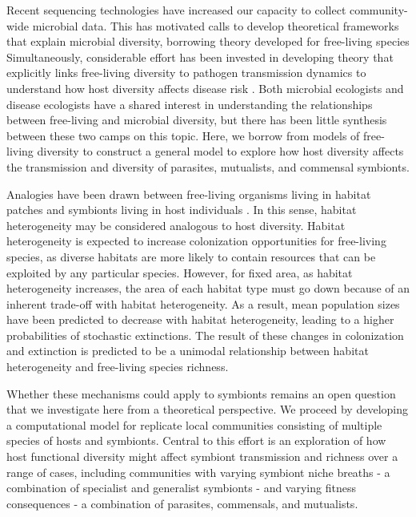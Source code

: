 \documentclass[12pt]{article}
\begin{document}
Recent sequencing technologies have increased our capacity to collect community-wide microbial data. 
This has motivated calls to develop theoretical frameworks that explain microbial diversity, borrowing theory developed for free-living species \citep{Prosser2007} %
Simultaneously, considerable effort has been invested in developing theory that explicitly links free-living diversity to pathogen transmission dynamics to understand how host diversity affects disease risk \citep{Dobson2004a, Roche2012, Joseph2013a, Mihaljevic2014}. 
Both microbial ecologists and disease ecologists have a shared interest in understanding the relationships between free-living and microbial diversity, but there has been little synthesis between these two camps on this topic. 
Here, we borrow from models of free-living diversity to construct a general model to explore how host diversity affects the transmission and diversity of parasites, mutualists, and commensal symbionts.

Analogies have been drawn between free-living organisms living in habitat patches and symbionts living in host individuals \citep{Mihaljevic2012}. 
In this sense, habitat heterogeneity may be considered analogous to host diversity. 
Habitat heterogeneity is expected to increase colonization opportunities for free-living species, as diverse habitats are more likely to contain resources that can be exploited by any particular species. 
However, for fixed area, as habitat heterogeneity increases, the area of each habitat type must go down because of an inherent trade-off with habitat heterogeneity. 
As a result, mean population sizes have been predicted to decrease with habitat heterogeneity, leading to a higher probabilities of stochastic extinctions. 
The result of these changes in colonization and extinction is predicted to be a unimodal relationship between habitat heterogeneity and free-living species richness. 

Whether these mechanisms could apply to symbionts remains an open question that we investigate here from a theoretical perspective. 
We proceed by developing a computational model for replicate local communities consisting of multiple species of hosts and symbionts. 
Central to this effort is an exploration of how host functional diversity might affect symbiont transmission and richness over a range of cases, including communities with varying symbiont niche breaths - a combination of specialist and generalist symbionts - and varying fitness consequences - a combination of parasites, commensals, and mutualists. 
\end{document}
